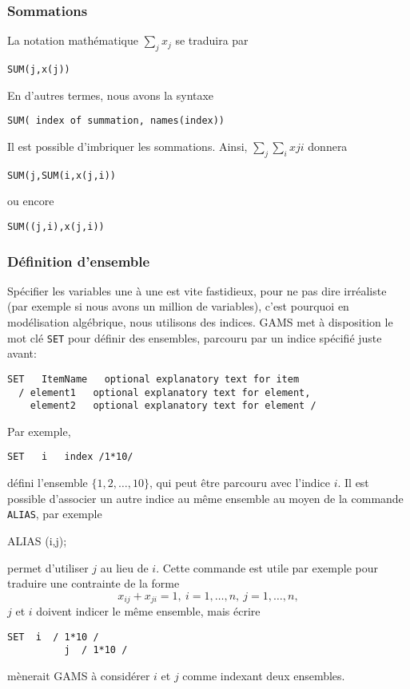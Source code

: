 \subsubsection{Sommations}

La notation mathématique $\sum_j x_j$ se traduira par
\begin{verbatim}
SUM(j,x(j))
\end{verbatim}
En d'autres termes, nous avons la syntaxe
\begin{verbatim}
SUM( index of summation, names(index))
\end{verbatim}
Il est possible d'imbriquer les sommations. Ainsi, $\sum_j \sum_i x{ji}$ donnera
\begin{verbatim}
SUM(j,SUM(i,x(j,i))
\end{verbatim}
ou encore
\begin{verbatim}
SUM((j,i),x(j,i))
\end{verbatim}

\subsubsection{Définition d'ensemble}

Spécifier les variables une à une est vite fastidieux, pour ne pas dire irréaliste (par exemple si nous avons un million de variables), c'est pourquoi en modélisation algébrique, nous utilisons des indices.
GAMS met à disposition le mot clé \verb|SET| pour définir des ensembles, parcouru par un indice spécifié juste avant:
\begin{verbatim}
SET   ItemName   optional explanatory text for item
  / element1   optional explanatory text for element,
    element2   optional explanatory text for element /
\end{verbatim}
Par exemple,
\begin{verbatim}
SET   i   index /1*10/
\end{verbatim}
défini l'ensemble $\lbrace 1,2,\ldots,10 \rbrace$, qui peut être parcouru avec l'indice $i$.
Il est possible d'associer un autre indice  au même ensemble  au moyen de la commande \verb|ALIAS|, par exemple
\begin{example}
ALIAS (i,j);
\end{example}
permet d'utiliser $j$ au lieu de $i$.
Cette commande est utile par exemple pour traduire une contrainte de la forme
\[
x_{ij} + x_{ji} = 1,\ i = 1,\ldots,n,\ j=1,\ldots,n,
\]
$j$ et $i$ doivent indicer le même ensemble, mais écrire
\begin{verbatim}
SET  i  / 1*10 /
          j  / 1*10 /
\end{verbatim}
mènerait GAMS à considérer $i$ et $j$ comme indexant deux ensembles.

